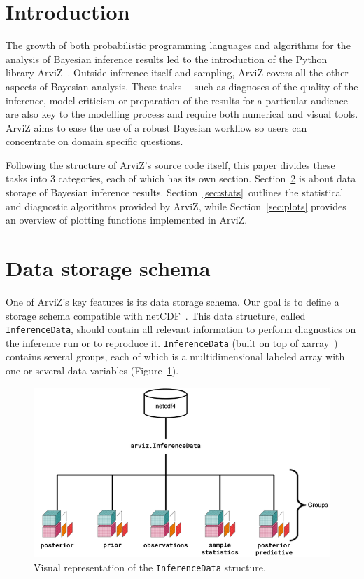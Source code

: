 \documentclass[anonymous=false, %
               format=acmsmall, %
               review=true, %
               screen=true, %
               nonacm=true]{acmart}
\begin{document}
\maketitle

\section{Introduction}
The growth of both probabilistic programming languages and algorithms for the
analysis of Bayesian inference results led to the introduction of the Python
library ArviZ~\cite{arviz2019}. Outside inference itself and sampling, ArviZ covers
all the other aspects of Bayesian analysis. These tasks ---such as diagnoses of
the quality of the inference, model criticism or preparation of the results
for a particular audience--- are also key to the modelling process and
require both numerical and visual tools. ArviZ aims to
ease the use of a robust
Bayesian workflow so users can concentrate on domain
specific questions.

Following the structure of ArviZ's source code itself, this
paper divides these tasks into 3 categories, each of which has its own
section. Section~\ref{sec:data} is about data storage of Bayesian inference
results.
Section~\ref{sec:stats}~outlines the statistical and diagnostic algorithms
provided by ArviZ, while Section~\ref{sec:plots} provides an overview of
plotting functions implemented in ArviZ.

\section{Data storage schema}\label{sec:data}
One of ArviZ's key features is its data storage schema. Our goal is to define
a storage schema compatible
with netCDF~\cite{unidata2011network}. This data structure, called
\texttt{InferenceData}, should contain all
relevant information to perform diagnostics on the inference run or to reproduce
it.
\texttt{InferenceData} (built on
top of xarray~\cite{hoyer2017xarray}) contains several groups, each of which is
a multidimensional labeled array with one or several data variables
(Figure~\ref{fig:data}).

\begin{figure}[!hbt]
  \centering
  \includegraphics[width=0.6\linewidth]{InferenceDataStructure.png}
  \caption{Visual representation of the \texttt{InferenceData}
  structure.}\label{fig:data}
\end{figure}
\end{document}
